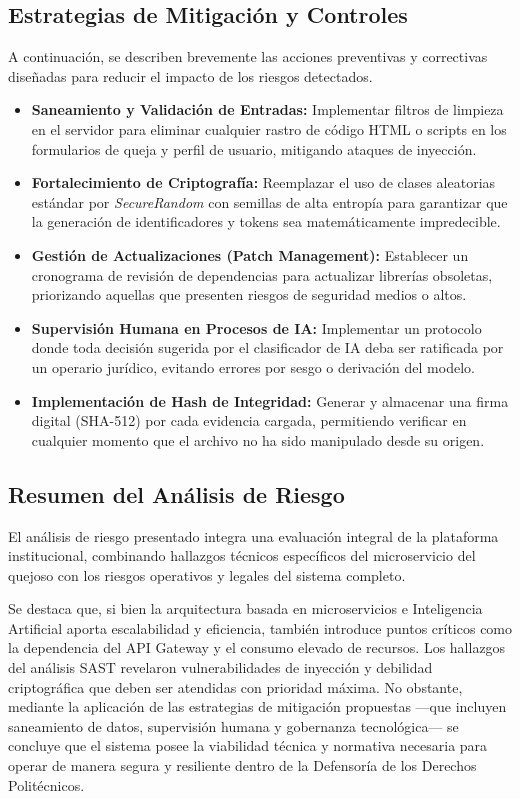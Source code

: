 \documentclass[12pt,oneside,letterpaper]{book}
\begin{document}
\subsection{Estrategias de Mitigación y Controles}

A continuación, se describen brevemente las acciones preventivas y correctivas diseñadas para reducir el impacto de los riesgos detectados.

\begin{itemize}
    \item \textbf{Saneamiento y Validación de Entradas:} Implementar filtros de limpieza en el servidor para eliminar cualquier rastro de código HTML o scripts en los formularios de queja y perfil de usuario, mitigando ataques de inyección.
    \item \textbf{Fortalecimiento de Criptografía:} Reemplazar el uso de clases aleatorias estándar por \textit{SecureRandom} con semillas de alta entropía para garantizar que la generación de identificadores y tokens sea matemáticamente impredecible.
    \item \textbf{Gestión de Actualizaciones (Patch Management):} Establecer un cronograma de revisión de dependencias para actualizar librerías obsoletas, priorizando aquellas que presenten riesgos de seguridad medios o altos.
    \item \textbf{Supervisión Humana en Procesos de IA:} Implementar un protocolo donde toda decisión sugerida por el clasificador de IA deba ser ratificada por un operario jurídico, evitando errores por sesgo o derivación del modelo.
    \item \textbf{Implementación de Hash de Integridad:} Generar y almacenar una firma digital (SHA-512) por cada evidencia cargada, permitiendo verificar en cualquier momento que el archivo no ha sido manipulado desde su origen.
\end{itemize}

\subsection{Resumen del Análisis de Riesgo}

El análisis de riesgo presentado integra una evaluación integral de la plataforma institucional, combinando hallazgos técnicos específicos del microservicio del quejoso con los riesgos operativos y legales del sistema completo. 

Se destaca que, si bien la arquitectura basada en microservicios e Inteligencia Artificial aporta escalabilidad y eficiencia, también introduce puntos críticos como la dependencia del API Gateway y el consumo elevado de recursos. Los hallazgos del análisis SAST revelaron vulnerabilidades de inyección y debilidad criptográfica que deben ser atendidas con prioridad máxima. No obstante, mediante la aplicación de las estrategias de mitigación propuestas —que incluyen saneamiento de datos, supervisión humana y gobernanza tecnológica— se concluye que el sistema posee la viabilidad técnica y normativa necesaria para operar de manera segura y resiliente dentro de la Defensoría de los Derechos Politécnicos.
\end{document}
